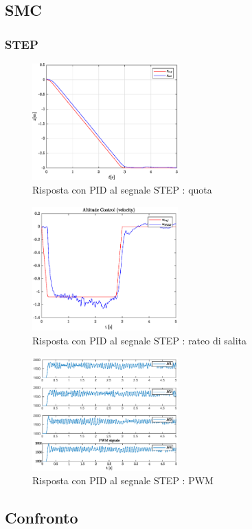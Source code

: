 \clearpage
\subsection{SMC}
\subsubsection{STEP}
\begin{figure}
	\centering
	\includegraphics[width=0.5\textwidth]{Simulazioni/Figure/SMC/STEP/AltitudeControlPos}
	\caption{Risposta con PID al segnale STEP : quota}
\end{figure}

\begin{figure}
	\centering
	\includegraphics[width=0.5\textwidth]{Simulazioni/Figure/SMC/STEP/ALtitudeControlVel}
	\caption{Risposta con PID al segnale STEP : rateo di salita}
\end{figure}

\begin{figure}
	\centering
	\includegraphics[width=0.5\textwidth]{Simulazioni/Figure/SMC/STEP/PWM}
	\caption{Risposta con PID al segnale STEP : PWM}
\end{figure}

\clearpage
\subsection{Confronto}